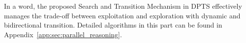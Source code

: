\vspace{0.07in}

In a word, the proposed Search and Transition Mechanism in DPTS effectively manages the trade-off between exploitation and exploration with dynamic and bidirectional transition. 
Detailed algorithms in this part can be found in Appendix~\ref{app:sec:parallel_reasoning}.  


